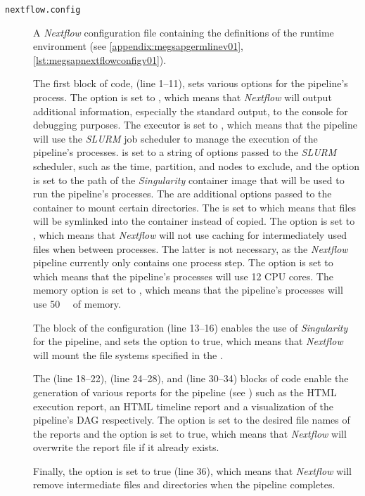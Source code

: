 \begin{description}
    \item[\texttt{nextflow.config}] A \textit{Nextflow} configuration file containing the definitions of the runtime environment (see \cref{appendix:megsapgermlinev01}, \cref{lst:megsapnextflowconfigv01}).
    
    The first block of code,  (line \numrange{1}{11}), sets various options for the pipeline's process. The  option is set to , which means that \textit{Nextflow} will output additional information, especially the standard output, to the console for debugging purposes. The executor is set to , which means that the pipeline will use the \textit{\ac{SLURM}} job scheduler to manage the execution of the pipeline's processes.  is set to a string of options passed to the \textit{\ac{SLURM}} scheduler, such as the time, partition, and nodes to exclude, and the  option is set to the path of the \textit{Singularity} container image that will be used to run the pipeline's processes. The  are additional options passed to the container to mount certain directories. The  is set to  which means that files will be symlinked into the container instead of copied. The  option is set to , which means that \textit{Nextflow} will not use caching for intermediately used files when between processes. The latter is not necessary, as the \textit{Nextflow} pipeline currently only contains one process step. The  option is set to  which means that the pipeline's processes will use 12 CPU cores. The memory option is set to , which means that the pipeline's processes will use \SI{50}{\giga\byte} of memory.
    
    The  block of the configuration (line \numrange{13}{16}) enables the use of \textit{Singularity} for the pipeline, and sets the  option to true, which means that \textit{Nextflow} will mount the file systems specified in the .
    
    The  (line \numrange{18}{22}),  (line \numrange{24}{28}), and  (line \numrange{30}{34}) blocks of code enable the generation of various reports for the pipeline (see \autocite{SeqeraLabs2022a}) such as the HTML execution report, an HTML timeline report and a visualization of the pipeline's \ac{DAG} respectively. The  option is set to the desired file names of the reports and the  option is set to true, which means that \textit{Nextflow} will overwrite the report file if it already exists.
    
    Finally, the  option is set to {true} (line \num{36}), which means that \textit{Nextflow} will remove intermediate files and directories when the pipeline completes.
\end{description}

